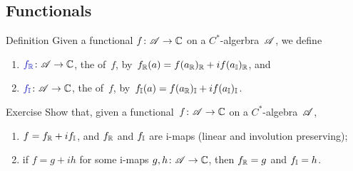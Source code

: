 \documentclass[a]{subfiles}
\begin{document}
\subsection{Functionals}
\begin{parsec}
\begin{point}{Definition}%
Given a functional $f\colon \mathscr{A}\to \mathbb{C}$
on a $C^*$-algerbra~$\mathscr{A}$,
we define
\begin{enumerate}
\item
$\Define{\Real{f}}\colon \scrA\to\C$,
the  of~$f$,
by~$f_{\mathbb{R}}(a)=f(a_{\mathbb{R}})_{\mathbb{R}}
+if(a_{\mathbb{I}})_{\mathbb{R}}$, and
\item
$\Define{\Imag{f}}\colon \scrA\to\C$,
the  of~$f$,
by~$f_{\mathbb{I}}(a)=f(a_{\mathbb{R}})_{\mathbb{I}}
+if(a_{\mathbb{I}})_{\mathbb{I}}$.
\end{enumerate}
\end{point}
\begin{point}{Exercise}%
Show that,
given a functional~$f\colon \mathscr{A}\to \mathbb{C}$
on a $C^*$-algebra~$\mathscr{A}$,
\begin{enumerate}
\item
	$f=f_{\mathbb{R}}+if_{\mathbb{I}}$, and 
	$f_{\mathbb{R}}$ and $f_{\mathbb{I}}$
	are i-maps (linear and involution preserving);
\item
	if $f=g+ih$ for some i-maps
	$g,h\colon \mathscr{A}\to\mathbb{C}$,
	then $f_{\mathbb{R}}=g$ and $f_{\mathbb{I}}=h$.
\end{enumerate}
\end{point}
\end{parsec}
\end{document}

